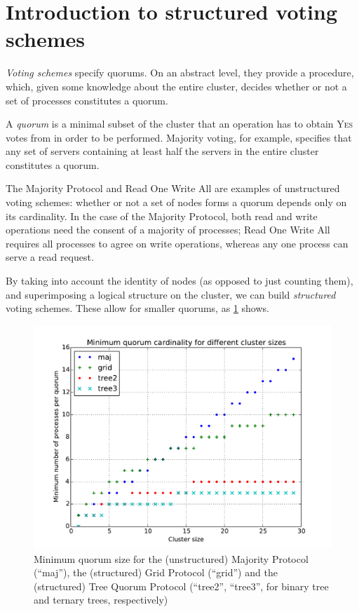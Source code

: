 \documentclass[12pt,chapterprefix=true,toc=bibliography,numbers=noendperiod,
               footnotes=multiple,twoside]{scrreprt}
\newcommand{\yes}{{\fontfamily{jkposn}\selectfont\textsc{Yes}}}
\begin{document}
\section{Introduction to structured voting schemes}
\label{ssc:structured-voting-schemes}

\emph{Voting schemes} specify quorums. On an abstract level, they provide a procedure, which, given some knowledge about the entire cluster, decides whether or not a set of processes constitutes a quorum.

A \emph{quorum} is a minimal subset of the cluster that an operation has to obtain \yes{} votes from in order to be performed. Majority voting, for example, specifies that any set of servers containing at least half the servers in the entire cluster constitutes a quorum.

The Majority Protocol and Read One Write All are examples of unstructured voting schemes: whether or not a set of nodes forms a quorum depends only on its cardinality. In the case of the Majority Protocol, both read and write operations need the consent of a majority of processes; Read One Write All requires all processes to agree on write operations, whereas any one process can serve a read request.

By taking into account the identity of nodes (as opposed to just counting them), and superimposing a logical structure on the cluster, we can build \emph{structured} voting schemes. These allow for smaller quorums, as \cref{fig:min-cardinality} shows.

\begin{figure}[h]
    \centering
    \includegraphics[scale=.75]{Images/card_30.pdf}
    \caption{Minimum quorum size for the (unstructured) Majority Protocol (\enquote{maj}), the (structured) Grid Protocol (\enquote{grid}) and the (structured) Tree Quorum Protocol (\enquote{tree2}, \enquote{tree3}, for binary tree and ternary trees, respectively)}
    \label{fig:min-cardinality}
\end{figure}
\end{document}
